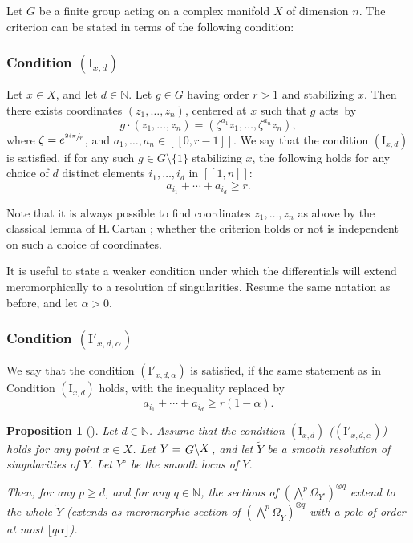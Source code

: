 \documentclass[JEP,XML,SOM,Unicode, NoEqCountersInSection,NoFloatCountersInSection,published]{cedram}
\newcommand{\llbracket}{[\![}
\newcommand{\rrbracket}{]\!]}
\newcommand{\rI}{\mathrm{I}}
\theoremstyle{theorem}
\newtheorem{proposition}{Proposition} [section]
\theoremstyle{definition}
\newcommand{\quotient}[2]{{\left.\raisebox{-.08em}{$#1$}\middle\backslash\raisebox{.08em}{$#2$}\right.}}
\begin{document}
Let $G$ be a finite group acting on a complex manifold $X$ of dimension $n$. The criterion can be stated in terms of the following condition:

\subsubsection*{Condition $(\rI_{x,d})$}
Let $x \in X$, and let $d \in \mathbb N$. Let $g\in G$ having order $r>1$ and stabilizing \(x\). Then there exists coordinates $(z_1,\dots, z_n)$, centered at $x$ such that $g$ acts~by
\[
g \cdot (z_1,\dots, z_n) = (\zeta^{a_1} z_1,\dots, \zeta^{a_n} z_n),
\]
where $\zeta = e^{\sfrac{2i\pi}{r}}$, and $a_1,\dots, a_n \in \llbracket 0, r - 1 \rrbracket$. We say that the condition $(\rI_{x, d})$ is satisfied, if for any such $g \in G\setminus \{ 1 \}$ stabilizing $x$, the following holds for any choice of $d$ distinct elements ${i_1},\dots, {i_d}$ in $\llbracket 1, n \rrbracket$:
\[
a_{i_1} +\cdots+ a_{i_d} \geq r.
\]

Note that it is always possible to find coordinates \(z_{1}, \dotsc, z_{n}\) as above by the classical lemma of H.\,Cartan \cite{Car53}; whether the criterion holds or not is independent on such a choice of coordinates.

It is useful to state a weaker condition under which the differentials will extend meromorphically to a resolution of singularities. Resume the same notation as before, and let $\alpha > 0$.

\subsubsection*{Condition $(\rI'_{x,d, \alpha})$}
We say that the condition $(\rI'_{x, d, \alpha})$ is satisfied, if the same statement as in Condition $(\rI_{x, d})$ holds, with the inequality replaced by
\[
a_{i_1} +\cdots+ a_{i_d} \geq r ( 1 - \alpha).
\]

\begin{proposition}[{\cite[Lem.\,4. p.\,213]{wei86}}] \label{propextension}
Let $d \in \mathbb N$. Assume that the condition $(\rI_{x, d})$ (\resp $(\rI'_{x, d, \alpha})$) holds for any point $x \in X$. Let $Y = \quotient{G}{X}$, and let $\widetilde{Y}$ be a smooth resolution of singularities of $Y$. Let $Y^\circ$ be the smooth locus of $Y$.

Then, for any $p \geq d$, and for any $q \in \mathbb N$, the sections of $(\bigwedge^p \Omega_{Y^\circ})^{\otimes q}$ extend to the whole $\widetilde{Y}$ (\resp extends as meromorphic section of $(\bigwedge^p \Omega_{\widetilde{Y}})^{\otimes q}$ with a pole of order at most $\lfloor q \alpha \rfloor$).
\end{proposition}
\end{document}
